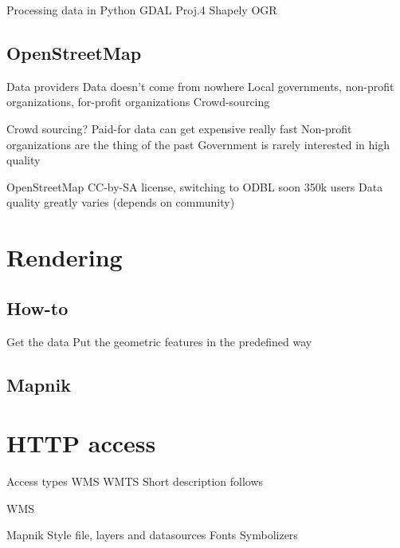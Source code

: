 \documentclass{beamer}
\begin{document}
\begin{frame}{Processing data in Python}
  GDAL
  Proj.4
  Shapely
  OGR
\end{frame}


\subsection{OpenStreetMap}

\begin{frame}{Data providers}
  Data doesn't come from nowhere
  Local governments, non-profit organizations, for-profit organizations
Crowd-sourcing
\end{frame}

\begin{frame}{Crowd sourcing?}
  Paid-for data can get expensive really fast
  Non-profit organizations are the thing of the past
  Government is rarely interested in high quality
\end{frame}

\begin{frame}{OpenStreetMap}
  CC-by-SA license, switching to ODBL soon
  350k users
  Data quality greatly varies (depends on community)
\end{frame}

\section{Rendering}

\subsection{How-to}

\begin{frame}{}
  Get the data
  Put the geometric features in the predefined way

\end{frame}

\subsection{Mapnik}

\begin{frame}{}

\end{frame}


\section{HTTP access}

\begin{frame}{Access types}
  WMS
  WMTS
  Short description follows
\end{frame}

\begin{frame}{WMS}

\end{frame}

Mapnik
Style file, layers and datasources
Fonts
Symbolizers
\end{document}
